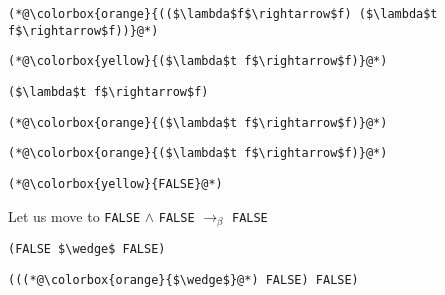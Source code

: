 \documentclass{beamer}
\begin{document}
\begin{frame}[fragile]{\CurrentSection}
\lstset{basicstyle=\ttfamily\small}\lstset{numbers=none}\lstset{language=ML}\begin{lstlisting}
(*@\colorbox{orange}{(($\lambda$f$\rightarrow$f) ($\lambda$t f$\rightarrow$f))}@*)
\end{lstlisting}
\pause\lstset{language=ML}\begin{lstlisting}
(*@\colorbox{yellow}{($\lambda$t f$\rightarrow$f)}@*)
\end{lstlisting}

\end{frame}

\begin{frame}[fragile]{\CurrentSection}
\lstset{basicstyle=\ttfamily\small}\lstset{numbers=none}\lstset{language=ML}\begin{lstlisting}
($\lambda$t f$\rightarrow$f)
\end{lstlisting}
\pause\lstset{language=ML}\begin{lstlisting}
(*@\colorbox{orange}{($\lambda$t f$\rightarrow$f)}@*)
\end{lstlisting}

\end{frame}

\begin{frame}[fragile]{\CurrentSection}
\lstset{basicstyle=\ttfamily\small}\lstset{numbers=none}\lstset{language=ML}\begin{lstlisting}
(*@\colorbox{orange}{($\lambda$t f$\rightarrow$f)}@*)
\end{lstlisting}
\pause\lstset{language=ML}\begin{lstlisting}
(*@\colorbox{yellow}{FALSE}@*)
\end{lstlisting}

\end{frame}

\begin{frame}[fragile]{\CurrentSection}
\begin{block}{\CurrentSubSection}
Let us move to \texttt{FALSE} $\wedge$ \texttt{FALSE} $\rightarrow_\beta$ \texttt{FALSE}
\end{block}


\end{frame}

\begin{frame}[fragile]{\CurrentSection}
\lstset{basicstyle=\ttfamily\small}\lstset{numbers=none}\lstset{language=ML}\begin{lstlisting}
(FALSE $\wedge$ FALSE)
\end{lstlisting}
\pause\lstset{language=ML}\begin{lstlisting}
(((*@\colorbox{orange}{$\wedge$}@*) FALSE) FALSE)
\end{lstlisting}

\end{frame}
\end{document}
